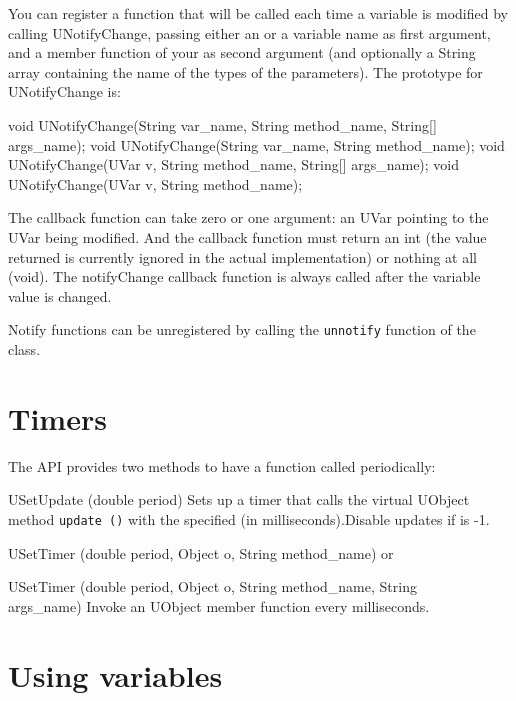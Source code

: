 You can register a function that will be called each time a variable is
modified by calling UNotifyChange, passing either an \UVar or a variable
name as first argument, and a member function of your \UObject as second
argument (and optionally a String array containing the name of the types of
the parameters). The prototype for UNotifyChange is:

\begin{java}
void UNotifyChange(String var_name, String method_name, String[] args_name);
void UNotifyChange(String var_name, String method_name);
void UNotifyChange(UVar v, String method_name, String[] args_name);
void UNotifyChange(UVar v, String method_name);
\end{java}

The callback function can take zero or one argument: an UVar pointing to the
UVar being modified. And the callback function must return an int (the value
returned is currently ignored in the actual implementation) or nothing at
all (void).  The notifyChange callback function is always called after the
variable value is changed.

Notify functions can be unregistered by calling the \lstinline|unnotify|
function of the \UVar class.

\section{Timers}
\label{sec:uob:apijava:timers}

The API provides two methods to have a function called periodically:

\begin{cxxapi}
\item[USetUpdate (double period)] Sets up a timer that calls the virtual
  UObject method \lstinline{update ()} with the specified  (in
  milliseconds).Disable updates if  is -1.
\item[USetTimer (double period, Object o, String method\_name)] or
\item[USetTimer (double period, Object o, String method\_name, String\[\]
  args\_name)] Invoke an UObject member function  every
   milliseconds.
\end{cxxapi}


\section{Using \urbi variables}
\label{sec:uob:apijava:uvar}

